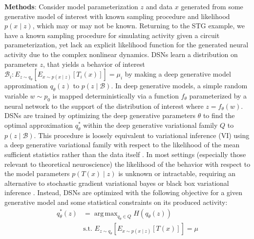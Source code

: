 \documentclass[12pt]{article}
\DeclareMathOperator*{\argmax}{arg\,max}
\begin{document}
\noindent \textbf{Methods}:
\noindent Consider model parameterization $z$ and data $x$ generated from some generative model of interest with known sampling procedure and likelihood $p(x \mid z)$, which may or may not be known.  Returning to the STG example, we have a known sampling procedure for simulating activity given a circuit parameterization, yet lack an explicit likelihood function for the generated neural activity due to the complex nonlinear dynamics. DSNs learn a distribution on parameters $z$, that yields a behavior of interest $\mathcal{B}_i: E_{z \sim q_\theta}\left[ E_{x\sim p(x \mid z)}\left[T_i(x)\right] \right] = \mu_i$ by making a deep generative model approximation \cite{rezende2015variational} $q_\theta(z)$ to $p(z \mid \mathcal{B})$.  In deep generative models, a simple random variable $w \sim p_0$ is mapped deterministically via a function $f_\theta$ parameterized by a neural network to the support of the distribution of interest where $z = f_{\theta}(w)$.  DSNs are trained by optimizing the deep generative parameters $\theta$ to find the optimal approximation $q_{\theta}^*$ within the deep generative variational family $Q$ to $p(z \mid \mathcal{B})$. This procedure is loosely equivalent to variational inference (VI) using a deep generative variational family with respect to the likelihood of the mean sufficient statistics rather than the data itself \cite{loaiza2017maximum, bittner2018learning}.  In most settings (especially those relevant to theoretical neuroscience) the likelihood of the behavior with respect to the model parameters $p(T(x) \mid z)$ is unknown or intractable, requiring an alternative to stochastic gradient variational bayes \cite{kingma2013auto} or black box variational inference \cite{ranganath2014black}. Instead, DSNs are optimized with the following objective for a given generative model and some statistical constraints on its produced activity:
\begin{equation}
\begin{split}
q_\theta^*(z) &= \argmax_{q_\theta \in Q} H(q_\theta(z)) \\
 &  \text{s.t.  } E_{z \sim q_\theta}\left[ E_{x\sim p(x \mid z)}\left[T(x)\right] \right] = \mu \\
 \end{split}
\end{equation}
\end{document}
